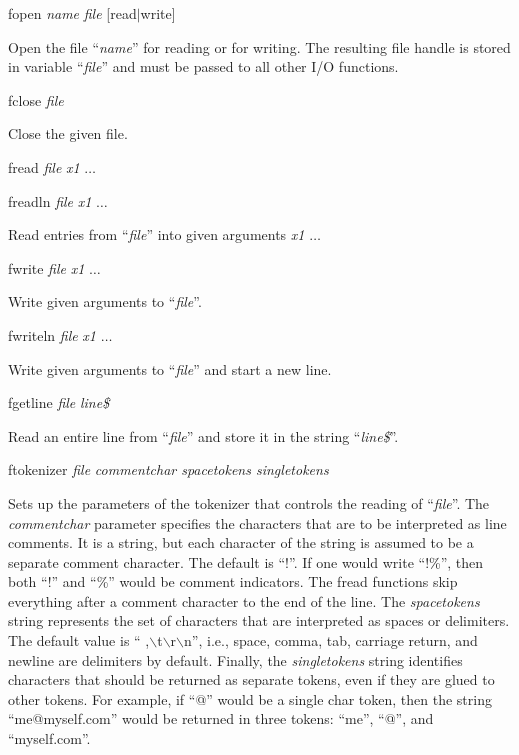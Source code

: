 \begin{commanddescription}
\item[{\sf fopen {\it name} {\it file} [read$|$write]}]

Open the file ``{\it name}'' for reading or for writing. The resulting file handle is stored in variable ``{\it file}'' and must be passed to all other I/O functions.

\item[{\sf fclose {\it file}}]

Close the given file.

\item[{\sf fread {\it file} {\it x1} $\ldots$}]
\item[{\sf freadln {\it file} {\it x1} $\ldots$}]

Read entries from ``{\it file}'' into given arguments {\it x1} $\ldots$

\item[{\sf fwrite {\it file} {\it x1} $\ldots$}]

Write given arguments to ``{\it file}''.

\item[{\sf fwriteln {\it file} {\it x1} $\ldots$}]

Write given arguments to ``{\it file}'' and start a new line.

\item[{\sf fgetline {\it file} {\it line\$}}]

Read an entire line from ``{\it file}'' and store it in the string ``{\it line\$}''.

\item[{\sf ftokenizer {\it file} {\it commentchar spacetokens singletokens}}]

Sets up the parameters of the tokenizer that controls the reading of ``{\it file}''. The {\it commentchar} parameter specifies the characters that are to be interpreted as line comments. It is a string, but each character of the string is assumed to be a separate comment character. The default is ``!''. If one would write ``!\%'', then both ``!'' and ``\%'' would be comment indicators. The {\sf fread} functions skip everything after a comment character to the end of the line. The {\it spacetokens} string represents the set of characters that are interpreted as spaces or delimiters. The default value is `` ,$\backslash$t$\backslash$r$\backslash$n'', i.e., space, comma, tab, carriage return, and newline are delimiters by default. Finally, the {\it singletokens} string identifies characters that should be returned as separate tokens, even if they are glued to other tokens. For example, if ``@'' would be a single char token, then the string ``me@myself.com'' would be returned in three tokens: ``me'', ``@'', and ``myself.com''. 

\end{commanddescription}

